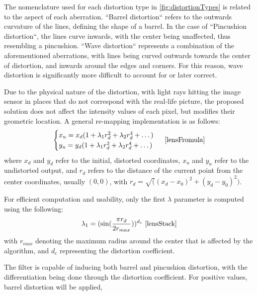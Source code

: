 The nomenclature used for each distortion type in \cref{fig:distortionTypes} is related to the aspect of each
aberration. ``Barrel distortion`` refers to the outwards curvature of the lines, defining the shape of a
barrel. In the case of ``Pincushion distortion``, the lines curve inwards, with the center being unaffected,
thus resembling a pincushion. ``Wave distortion`` represents a combination of the aforementioned aberrations,
with lines being curved outwards towards the center of distortion, and inwards around the edges and corners.
For this reason, wave distortion is significantly more difficult to account for or later correct.

Due to the physical nature of the distortion, with light rays hitting the image sensor in places that do not
correspond with the real-life picture, the proposed solution does not affect the intensity values of each
pixel, but modifies their geometric location. A general re-mapping implementation is as follows:
\begin{equation}
	\label{eq:lensFormula}
	\begin{cases}
		x_u = x_d(1 + \lambda_1r_d^2 + \lambda_2r_d^4 + \dots) \\
		y_u = y_d(1 + \lambda_1r_d^2 + \lambda_2r_d^4 + \dots) \\
	\end{cases}
	\text{ \cite{lensFromula}}
\end{equation}
where \(x_d\) and \(y_d\) refer to the initial, distorted coordinates, \(x_u\) and \(y_u\) refer to the
undistorted output, and \(r_d\) refers to the distance of the current point from the center coordinates,
usually \((0, 0)\), with \(r_d = \sqrt((x_d - x_0)^2 + (y_d - y_0)^2)\).

For efficient computation and usability, only the first \(\lambda\) parameter is computed using the following:
\begin{equation}
	\label{eq:lensLambda}
	\lambda_1 = (\sin({{\pi r_d}\over{2 r_{max}}}))^{d_c}
	\text{ \cite{lensStack}}
\end{equation}
with \(r_{max}\) denoting the maximum radius around the center that is affected by the algorithm, and \(d_c\)
representing the distortion coefficient.

The filter is capable of inducing both barrel and pincushion distortion, with the differentiation being done
through the distortion coefficient. For positive values, barrel distortion will be applied,

